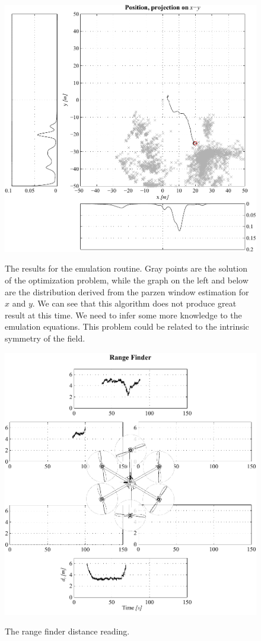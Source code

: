 \begin{figure}[f]
	\centering
	\includegraphics[]{ch4/img/ParzenWindow.pdf}
\label{fig:parzwin}
\caption{The results for the emulation routine. Gray points are the solution of the optimization problem, while the graph on the left and below are the distribution derived from the parzen window estimation for $x$ and $y$. We can see that this algorithm does not produce great result at this time. We need to infer some more knowledge to the emulation equations. This problem could be related to the intrinsic symmetry of the field.}
\end{figure}

\begin{figure}[f]
	\centering
	\includegraphics[]{ch4/img/RangeFinder.pdf}
\label{fig:rangefinder}
\caption{The range finder distance reading.}
\end{figure}

